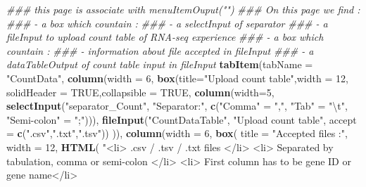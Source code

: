 \documentclass[
  12pt,
]{article}
\newenvironment{Shaded}{\begin{snugshade}}{\end{snugshade}}
\newcommand{\CharTok}[1]{\textcolor[rgb]{0.31,0.60,0.02}{#1}}
\newcommand{\CommentTok}[1]{\textcolor[rgb]{0.56,0.35,0.01}{\textit{#1}}}
\newcommand{\DataTypeTok}[1]{\textcolor[rgb]{0.13,0.29,0.53}{#1}}
\newcommand{\DecValTok}[1]{\textcolor[rgb]{0.00,0.00,0.81}{#1}}
\newcommand{\KeywordTok}[1]{\textcolor[rgb]{0.13,0.29,0.53}{\textbf{#1}}}
\newcommand{\NormalTok}[1]{#1}
\newcommand{\OtherTok}[1]{\textcolor[rgb]{0.56,0.35,0.01}{#1}}
\newcommand{\StringTok}[1]{\textcolor[rgb]{0.31,0.60,0.02}{#1}}
\begin{document}
\begin{Shaded}
\begin{Highlighting}[]
            \CommentTok{### this page is associate with menuItemOuput("")}
            \CommentTok{### On this page we find :}
            \CommentTok{###   - a box which countain :}
            \CommentTok{###       - a selectInput of separator }
            \CommentTok{###       - a fileInput to upload count table of RNA-seq experience}
            \CommentTok{###   - a box which countain :}
            \CommentTok{###       - information about file accepted in fileInput }
            \CommentTok{###   - a dataTableOutput of count table input in fileInput}
            \KeywordTok{tabItem}\NormalTok{(}\DataTypeTok{tabName =} \StringTok{"CountData"}\NormalTok{,}
                    \KeywordTok{column}\NormalTok{(}\DataTypeTok{width =} \DecValTok{6}\NormalTok{,}
                           \KeywordTok{box}\NormalTok{(}\DataTypeTok{title=}\StringTok{"Upload count table"}\NormalTok{,}\DataTypeTok{width =} \DecValTok{12}\NormalTok{, }\DataTypeTok{solidHeader =} \OtherTok{TRUE}\NormalTok{,}\DataTypeTok{collapsible =} \OtherTok{TRUE}\NormalTok{,}
                               \KeywordTok{column}\NormalTok{(}\DataTypeTok{width=}\DecValTok{5}\NormalTok{,}
                                      \KeywordTok{selectInput}\NormalTok{(}\StringTok{"separator_Count"}\NormalTok{, }\StringTok{"Separator:"}\NormalTok{, }\KeywordTok{c}\NormalTok{(}\StringTok{"Comma"}\NormalTok{ =}\StringTok{ ","}\NormalTok{,                                                                                     }\StringTok{"Tab"}\NormalTok{ =}\StringTok{ "}\CharTok{\textbackslash{}t}\StringTok{"}\NormalTok{, }\StringTok{"Semi-colon"}\NormalTok{ =}\StringTok{ ";"}\NormalTok{))),}
                               \KeywordTok{fileInput}\NormalTok{(}\StringTok{"CountDataTable"}\NormalTok{, }\StringTok{"Upload count table"}\NormalTok{, }
                                         \DataTypeTok{accept =} \KeywordTok{c}\NormalTok{(}\StringTok{".csv"}\NormalTok{,}\StringTok{".txt"}\NormalTok{,}\StringTok{".tsv"}\NormalTok{))}
\NormalTok{                           )),}
                    \KeywordTok{column}\NormalTok{(}\DataTypeTok{width =} \DecValTok{6}\NormalTok{,}
                           \KeywordTok{box}\NormalTok{(}
                             \DataTypeTok{title =} \StringTok{"Accepted files :"}\NormalTok{, }\DataTypeTok{width =} \DecValTok{12}\NormalTok{,}
                             \KeywordTok{HTML}\NormalTok{(}
                               \StringTok{"<li> .csv / .tsv / .txt files </li>}
\StringTok{                               <li> Separated by tabulation, comma or semi-colon </li>}
\StringTok{                               <li> First column has to be gene ID or gene name</li>}

\end{Highlighting}
\end{Shaded}
\end{document}
